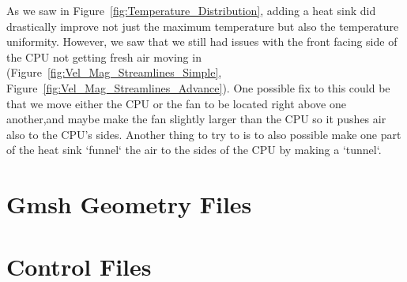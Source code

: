 \documentclass[a4paper, 10pt]{article}
\begin{document}
		\noindent As we saw in Figure~\ref{fig:Temperature_Distribution}, adding a heat sink did drastically improve not just the maximum temperature but also the temperature uniformity.
		However, we saw that we still had issues with the front facing side of the CPU not getting fresh air moving in (Figure~\ref{fig:Vel_Mag_Streamlines_Simple}, Figure~\ref{fig:Vel_Mag_Streamlines_Advance}).
		One possible fix to this could be that we move either the CPU or the fan to be located right above one another,and maybe make the fan slightly larger than the CPU so it pushes air also to the CPU's sides.
		Another thing to try to is to also possible make one part of the heat sink `funnel` the air to the sides of the CPU by making a `tunnel`.


	\pagebreak
	\appendix
	\section{Gmsh Geometry Files}
	\label{Appendix:GeoFiles}

	

	\vspace{2cm}

	

	\pagebreak
	\section{Control Files}
	\label{Appendix:ControlFiles}

	
\end{document}
